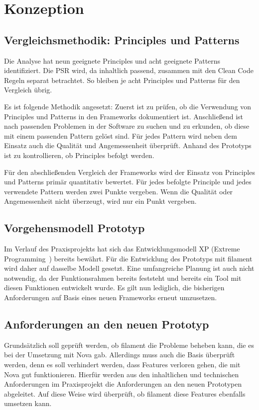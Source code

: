 
\newpage


\section{Konzeption}

\subsection{Vergleichsmethodik: Principles und Patterns}
Die Analyse hat neun geeignete Principles und acht geeignete Patterns identifiziert.
Die PSR wird, da inhaltlich passend, zusammen mit den Clean Code Regeln separat betrachtet.
So bleiben je acht Principles und Patterns für den Vergleich übrig.

Es ist folgende Methodik angesetzt:
Zuerst ist zu prüfen, ob die Verwendung von Principles und Patterns in den Frameworks dokumentiert ist.
Anschließend ist nach passenden Problemen in der Software zu suchen und zu erkunden, ob diese mit einem passenden Pattern gelöst sind.
Für jedes Pattern wird neben dem Einsatz auch die Qualität und Angemessenheit überprüft.
Anhand des Prototyps ist zu kontrollieren, ob Principles befolgt werden.

Für den abschließenden Vergleich der Frameworks wird der Einsatz von Principles und Patterns primär quantitativ bewertet.
Für jedes befolgte Principle und jedes verwendete Pattern werden zwei Punkte vergeben.
Wenn die Qualität oder Angemessenheit nicht überzeugt, wird nur ein Punkt vergeben.

\subsection{Vorgehensmodell Prototyp}
Im Verlauf des Praxisprojekts hat sich das Entwicklungsmodell XP (Extreme Programming~\cite{agile-prozesse}) bereits bewährt.
Für die Entwicklung des Prototyps mit filament wird daher auf dasselbe Modell gesetzt.
Eine umfangreiche Planung ist auch nicht notwendig, da der Funktionsrahmen bereits feststeht und bereits ein Tool mit diesen Funktionen entwickelt wurde.
Es gilt nun lediglich, die bisherigen Anforderungen auf Basis eines neuen Frameworks erneut umzusetzen.

\newpage

\subsection{Anforderungen an den neuen Prototyp}
Grundsätzlich soll geprüft werden, ob filament die Probleme beheben kann, die es bei der Umsetzung mit Nova gab.
Allerdings muss auch die Basis überprüft werden, denn es soll verhindert werden, dass Features verloren gehen, die mit Nova gut funktionieren.
Hierfür werden aus den inhaltlichen und technischen Anforderungen im Praxisprojekt die Anforderungen an den neuen Prototypen abgeleitet.
Auf diese Weise wird überprüft, ob filament diese Features ebenfalls umsetzen kann.

